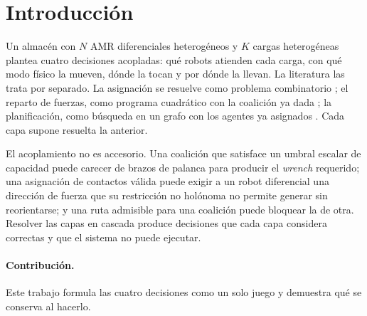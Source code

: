 \documentclass[11pt,a4paper]{article}
\theoremstyle{plain}
\theoremstyle{definition}
\theoremstyle{remark}
\begin{document}
\section{Introducción}
\label{sec:introduccion}

Un almacén con $N$ AMR diferenciales heterogéneos y $K$ cargas heterogéneas
plantea cuatro decisiones acopladas: qué robots atienden cada carga, con qué
modo físico la mueven, dónde la tocan y por dónde la llevan. La literatura las
trata por separado. La asignación se resuelve como problema combinatorio
\cite{gerkey2004taxonomy,choi2009cbba}; el reparto de fuerzas, como programa
cuadrático con la coalición ya dada \cite{nakamura1989dynamics}; la
planificación, como búsqueda en un grafo con los agentes ya asignados
\cite{sharon2015cbs}. Cada capa supone resuelta la anterior.

El acoplamiento no es accesorio. Una coalición que satisface un umbral escalar
de capacidad puede carecer de brazos de palanca para producir el \emph{wrench}
requerido; una asignación de contactos válida puede exigir a un robot
diferencial una dirección de fuerza que su restricción no holónoma no permite
generar sin reorientarse; y una ruta admisible para una coalición puede
bloquear la de otra. Resolver las capas en cascada produce decisiones que cada
capa considera correctas y que el sistema no puede ejecutar.

\paragraph{Contribución.} Este trabajo formula las cuatro decisiones como un
solo juego y demuestra qué se conserva al hacerlo.
\end{document}

